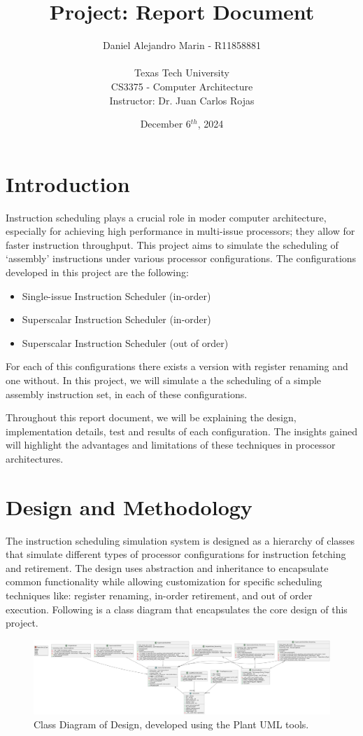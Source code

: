 \documentclass{article}
\title{Project: Report Document}
\author{Daniel Alejandro Marin - R11858881\\ \\ Texas Tech University \\CS3375 - Computer Architecture \\ Instructor: Dr. Juan Carlos Rojas}
\date{December 6$^{th}$, 2024}
\begin{document}
\maketitle
\tableofcontents
\newpage
\section{Introduction}
Instruction scheduling plays a crucial role in moder computer architecture, especially for achieving high performance in multi-issue processors; they allow for faster instruction throughput. This project aims to simulate the scheduling of `assembly' instructions under various processor configurations. The configurations developed in this project are the following:

\begin{itemize}
    \item Single-issue Instruction Scheduler (in-order)
    \item Superscalar Instruction Scheduler (in-order)
    \item Superscalar Instruction Scheduler (out of order) 
\end{itemize}

For each of this configurations there exists a version with register renaming and one without. In this project, we will simulate a the scheduling of a simple assembly instruction set, in each of these configurations. 

Throughout this report document, we will be explaining the design, implementation details, test and results of each configuration. The insights gained will highlight the advantages and limitations of these techniques in processor architectures. 

\section{Design and Methodology}
The instruction scheduling simulation system is designed as a hierarchy of classes that simulate different types of processor configurations for instruction fetching and retirement. The design uses abstraction and inheritance to encapsulate common functionality while allowing customization for specific scheduling techniques like: register renaming, in-order retirement, and out of order execution. Following is a class diagram that encapsulates the core design of this project.

\begin{figure}[H]
    \centering
    \includegraphics[width=1\textwidth]{ClassDiagram.png}  
    \caption{Class Diagram of Design, developed using the Plant UML tools.}  
    \label{fig:ClassDiagram}
\end{figure}
\end{document}
